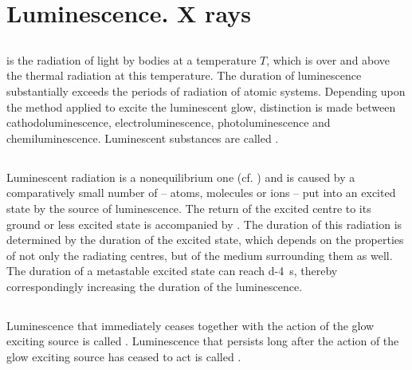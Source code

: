 \section{Luminescence. X rays}
\label{sec-39.7} 


\subsection{}\label{39.7.1}  is the radiation of light by bodies at a temperature $T$, which is over and above the thermal radiation  at this temperature. The duration of luminescence substantially exceeds the periods of radiation of atomic systems. Depending upon the method applied to excite the luminescent glow, distinction is made between cathodoluminescence, electroluminescence, photoluminescence and chemiluminescence. Luminescent substances are called .

\subsection{}\label{39.7.2} Luminescent radiation is a nonequilibrium one (cf. ) and is caused by a comparatively small number of  --  atoms, molecules or ions -- put into an excited state by the source of luminescence. The return of the excited centre to its ground or less excited state is accompanied by . The duration of this radiation is determined by the duration of the excited state, which depends on the properties of not only the radiating centres, but of the medium surrounding them as well. The duration of a metastable excited state can reach \SI{d-4}{\second}, thereby correspondingly increasing the duration of the luminescence.

\subsection{}\label{39.7.3} Luminescence that immediately ceases together with the action of the glow exciting source is called . Luminescence that persists long after the action of the glow exciting source has ceased to act is called . 

